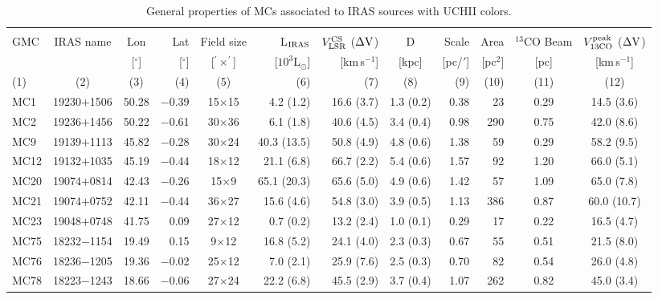 \documentclass[iop]{emulateapj}
\begin{document}
\begin{table*}[!h!t]
\begin{center}
\centering 
\caption{General properties of MCs associated to IRAS sources with UCHII colors. }
\begin{tabular}{lccrcrrcrrcc}
\hline
\hline
  &    &   &   &      &   &  &  &  &  &  &\\
GMC  & IRAS name & Lon & Lat & Field size & L$_{\rm IRAS}$ & $V_{\rm LSR}^{\rm CS}$ ($\rm \Delta V$) &D  &Scale  & Area & $^{13}$CO Beam      &  $V_{\rm 13CO}^{\rm peak}$ ($\rm \Delta V$)  \\
  &  & [$^\circ$]   & [$^\circ$] &[$^\prime\times^\prime$]  & [$10^3$L$_{\odot}$]   & [km\,s$^{-1}$]   & [kpc]  &  [pc/$\prime$]      &[pc$^2$]   &  [pc]   &  [km\,s$^{-1}$] \\ 
(1) & (2) & (3) & (4)  & (5) & (6)  & (7) & (8) & (9) & (10) & (11) & (12)\\
\hline
MC1  & 19230$+$1506  & 50.28 & $-$0.39  & 15$\times$15 & 4.2 (1.2)  &  16.6 (3.7)  &  1.3 (0.2)  & 0.38 & 23  & 0.29 &  14.5 (3.6)  \\
MC2  & 19236$+$1456  & 50.22 & $-$0.61  & 30$\times$36 & 6.1 (1.8)  &  40.6 (4.5)  &  3.4 (0.4)  & 0.98 & 290 & 0.75 &  42.0 (8.6)  \\
MC9  & 19139$+$1113  & 45.82 & $-$0.28  & 30$\times$24 & 40.3 (13.5) &  50.8 (4.9)  &  4.8 (0.6)  & 1.38 & 59  & 0.29 &  58.2 (9.5)  \\
MC12 & 19132$+$1035  & 45.19 & $-$0.44  & 18$\times$12 & 21.1 (6.8) &  66.7 (2.2)  &  5.4 (0.6)  & 1.57 & 92  & 1.20 &  66.0 (5.1)  \\
MC20 & 19074$+$0814  & 42.43 & $-$0.26  & 15$\times$9  & 65.1 (20.3) &  65.6 (5.0)  &  4.9 (0.6)  & 1.42 & 57  & 1.09 &  65.0 (7.8)  \\
MC21 & 19074$+$0752  & 42.11 & $-$0.44  & 36$\times$27 & 15.6 (4.6) &  54.8 (3.0)  &   3.9 (0.5) & 1.13 & 386 & 0.87 &  60.0 (10.7)  \\
MC23 & 19048$+$0748  & 41.75 &    0.09  & 27$\times$12 & 0.7 (0.2)  &  13.2 (2.4)  &   1.0 (0.1) & 0.29 & 17  & 0.22 &  16.5 (4.7)  \\
MC75 & 18232$-$1154  & 19.49 &    0.15  & 9$\times$12  & 16.8 (5.2) &  24.1 (4.0)  &  2.3 (0.3)  & 0.67 & 55  & 0.51 &  21.5 (8.0)  \\
MC76 & 18236$-$1205  & 19.36 & $-$0.02  & 25$\times$12 &  7.0 (2.1) &  25.9 (7.6)  &  2.5 (0.3)  & 0.70 &  82 & 0.54 &  26.0 (4.8)  \\
MC78 & 18223$-$1243  & 18.66 & $-$0.06  & 27$\times$24 & 22.2 (6.8) &  45.5 (2.9)  &  3.7 (0.4)  & 1.07 & 262 & 0.82 &  45.0 (3.4)  \\

\end{tabular}
\end{center}
\end{table*}
\end{document}
